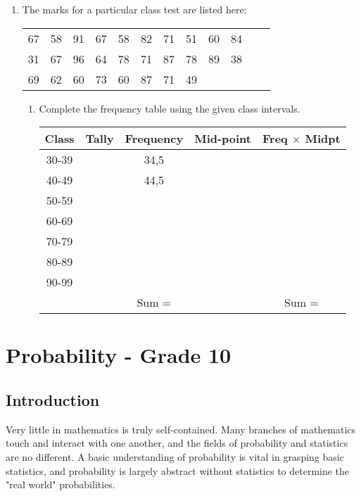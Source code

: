 \documentclass[10pt,a4paper,titlepage,twoside,openright]{report}
\begin{document}
\begin{enumerate}
\item{The marks for a particular class test are listed here:
\begin{center}
\begin{tabular}{c c c c c c c c c c c c}
67 & 58 & 91 & 67 & 58 & 82 & 71 & 51 & 60 & 84 \\
31 & 67 & 96 & 64 & 78 & 71 & 87 & 78 & 89 & 38 \\
69 & 62 & 60 & 73 & 60 & 87 & 71 & 49 & & \\
\end{tabular}
\end{center}
\begin{enumerate}
\item{Complete the frequency table using the given class intervals.
\begin{center}
\begin{tabular}{|c|c|c|c|c|}\hline
Class & Tally & Frequency & Mid-point & Freq $\times$ Midpt \\\hline
30-39 & & 34,5 & & \\\hline
40-49 & & 44,5 & & \\\hline
50-59 & & & & \\\hline
60-69 & & & & \\\hline
70-79 & & & & \\\hline
80-89 & & & & \\\hline
90-99 & & & & \\\hline
 & & Sum = & & Sum =  \\\hline
\end{tabular}
\end{center}
}
\end{enumerate}
}

\end{enumerate}






\chapter{Probability - Grade 10}
\label{m:p10}

\section{Introduction}
Very little in mathematics is truly self-contained. Many branches of mathematics touch and interact with one another, and the fields of probability and statistics are no different. A basic understanding of probability is vital in grasping basic statistics, and probability is largely abstract without statistics to determine the "real world" probabilities.
\end{document}
